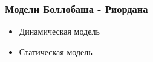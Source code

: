 \frametitle{Модели Боллобаша - Риордана}


\begin{itemize} 
    \item{Динамическая модель}     
    \item{Статическая модель}     
\end{itemize} 